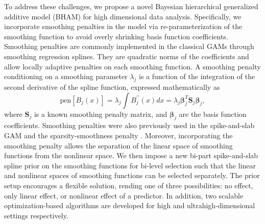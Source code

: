 \documentclass[AMA,STIX1COL,]{WileyNJD-v2}
\begin{document}
To address these challenges, we propose a novel Bayesian hierarchical
generalized additive model (BHAM) for high dimensional data analysis.
Specifically, we incorporate smoothing penalties in the model via
re-parameterization of the smoothing function to avoid overly shrinking
basis function coefficients. Smoothing penalties are commonly
implemented in the classical GAMs through smoothing regression splines.
They are quadratic norms of the coefficients and allow locally adaptive
penalties on each smoothing function. A smoothing penalty conditioning
on a smoothing parameter \(\lambda_j\) is a function of the integration
of the second derivative of the spline function, expressed
mathematically as \begin{equation}\label{eq:smoothpen}
  \text{pen}\left[B_j(x)\right] = \lambda_j \int B^{\prime\prime}_j(x)dx = \lambda_j \boldsymbol{\beta}_j^T \boldsymbol{S}_j \boldsymbol{\beta}_j ,
\end{equation} where \(\boldsymbol{S}_j\) is a known smoothing penalty
matrix, and \(\boldsymbol{\beta}_j\) are the basis function
coefficients. Smoothing penalties were also previously used in the
spike-and-slab GAM \citep{Scheipl2012} and the sparsity-smoothness
penalty \citep{Meier2009}. Moreover, incorporating the smoothing penalty
allows the separation of the linear space of smoothing functions from
the nonlinear space. We then impose a new bi-part spike-and-slab spline
prior on the smoothing functions for bi-level selection such that the
linear and nonlinear spaces of smoothing functions can be selected
separately. The prior setup encourages a flexible solution, rending one
of three possibilities: no effect, only linear effect, or nonlinear
effect of a predictor. In addition, two scalable optimization-based
algorithms are developed for high and
ultrahigh-dimensional\citep{Fan2009} settings respectively.
\end{document}
